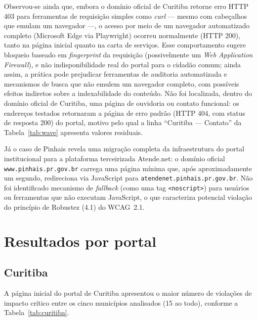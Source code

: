 \documentclass[brazil]{ifpr-pinhais}
\begin{document}
Observou-se ainda que, embora o domínio oficial de Curitiba retorne erro HTTP 403 para ferramentas de requisição simples como \textit{curl} --- mesmo com cabeçalhos que emulam um navegador ---, o acesso por meio de um navegador automatizado completo (Microsoft Edge via Playwright) ocorreu normalmente (HTTP 200), tanto na página inicial quanto na carta de serviços. Esse comportamento sugere bloqueio baseado em \textit{fingerprint} da requisição (possivelmente um \textit{Web Application Firewall}), e não indisponibilidade real do portal para o cidadão comum; ainda assim, a prática pode prejudicar ferramentas de auditoria automatizada e mecanismos de busca que não emulem um navegador completo, com possíveis efeitos indiretos sobre a indexabilidade do conteúdo. Não foi localizada, dentro do domínio oficial de Curitiba, uma página de ouvidoria ou contato funcional: os endereços testados retornaram a página de erro padrão (HTTP 404, com status de resposta 200) do portal, motivo pelo qual a linha ``Curitiba --- Contato'' da Tabela~\ref{tab:wave} apresenta valores residuais.

Já o caso de Pinhais revela uma migração completa da infraestrutura do portal institucional para a plataforma terceirizada Atende.net: o domínio oficial \texttt{www.pinhais.pr.gov.br} carrega uma página mínima que, após aproximadamente um segundo, redireciona via JavaScript para \texttt{atendenet.pinhais.pr.gov.br}. Não foi identificado mecanismo de \textit{fallback} (como uma tag \texttt{<noscript>}) para usuários ou ferramentas que não executam JavaScript, o que caracteriza potencial violação do princípio de Robustez (4.1) do WCAG~2.1.

\section{Resultados por portal}

\subsection{Curitiba}
\label{subsec:curitiba}

A página inicial do portal de Curitiba apresentou o maior número de violações de impacto crítico entre os cinco municípios analisados (15 ao todo), conforme a Tabela~\ref{tab:curitiba}.
\end{document}
